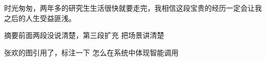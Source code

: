 \begin{thanks}
时光匆匆，两年多的研究生生活很快就要走完，我相信这段宝贵的经历一定会让我之后的人生受益匪浅。

\begin{flushright}
{}

\end{flushright}

\end{thanks}

摘要前面两段没说清楚，第三段扩充
把场景讲清楚

张欢的图引用了，标注一下
怎么在系统中体现智能调用